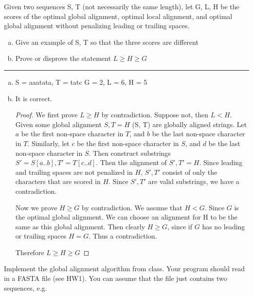 \documentclass[11pt]{article}
\begin{document}
Given two sequences S, T (not necessarily the same length), let G, L, H be the scores of the
optimal global alignment, optimal local alignment, and optimal global alignment without penalizing leading or trailing spaces.


\begin{enumerate}[a)]
    \item Give an example of S, T so that the three scores are different
    \item Prove or disprove the statement $L \geq H \geq G$
\end{enumerate}

\hrule

\begin{enumerate}[a)]
    \item S = aaatata, T = tatc
    G = 2, L = 6, H = 5

    \item It is correct.
    \begin{proof}
        We first prove $L \geq H$ by contradiction.
        Suppose not, then $L < H$. 
        Given some global alignment $S, T = H$ (S, T) are globally aligned strings. 
        Let $a$ be the first non-space character in $T$, and $b$ be the last non-space character in $T$.
        Similarly, let $c$ be the first non-space character in $S$, and $d$ be the last non-space character in $S$.
        Then construct substrings $S' = S[a .. b], T' = T[c .. d]$.
        Then the alignment of $S', T' = H$. Since leading and trailing spaces
        are not penalized in $H$, $S', T'$  consist of only the characters that are scored in $H$.
        Since $S', T'$ are valid substrings, we have a contradiction. 

        Now we prove $H \geq G$ by contradiction.
        We assume that $H < G$. Since $G$ is the optimal global alignment.
        We can choose an alignment for H to be the same as this global alignment. 
        Then clearly $H \geq G$, since if $G$ has no leading or trailing spaces $H = G$.
        Thus a contradiction.

        Therefore $L \geq H \geq G$
    \end{proof}

\end{enumerate}



Implement the global alignment algorithm from class.  Your program should read in a FASTA file (see HW1).  You can assume that the file just contains two sequences, e.g.
\end{document}

